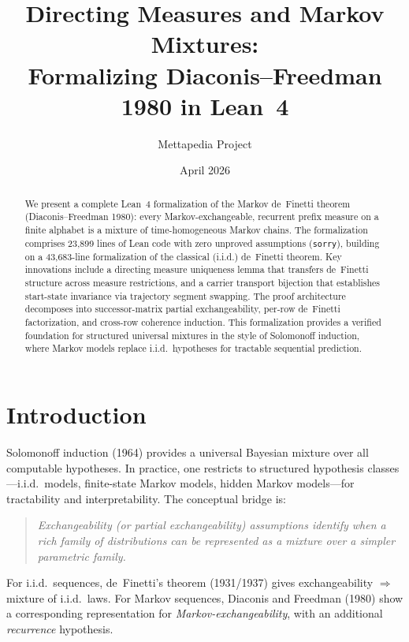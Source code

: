 \documentclass[11pt,a4paper]{article}
\title{Directing Measures and Markov Mixtures:\\[0.3em]
\large Formalizing Diaconis--Freedman 1980 in Lean~4}
\author{Mettapedia Project}
\date{April 2026}
\theoremstyle{definition}
\begin{document}
\maketitle

\begin{abstract}
We present a complete Lean~4 formalization of the Markov de~Finetti theorem
(Diaconis--Freedman 1980): every Markov-exchangeable, recurrent prefix measure
on a finite alphabet is a mixture of time-homogeneous Markov chains. The
formalization comprises 23,899 lines of Lean code with zero unproved
assumptions (\texttt{sorry}), building on a 43,683-line formalization of the
classical (i.i.d.) de~Finetti theorem. Key innovations include a directing
measure uniqueness lemma that transfers de~Finetti structure across measure
restrictions, and a carrier transport bijection that establishes start-state
invariance via trajectory segment swapping. The proof architecture decomposes
into successor-matrix partial exchangeability, per-row de~Finetti factorization,
and cross-row coherence induction. This formalization provides a verified
foundation for structured universal mixtures in the style of Solomonoff
induction, where Markov models replace i.i.d.\ hypotheses for tractable
sequential prediction.
\end{abstract}

\tableofcontents

\section{Introduction}

Solomonoff induction (1964) provides a universal Bayesian mixture over all
computable hypotheses. In practice, one restricts to structured hypothesis
classes---i.i.d.\ models, finite-state Markov models, hidden Markov
models---for tractability and interpretability. The conceptual bridge is:

\begin{quote}
\emph{Exchangeability (or partial exchangeability) assumptions identify when
a rich family of distributions can be represented as a mixture over a simpler
parametric family.}
\end{quote}

For i.i.d.\ sequences, de~Finetti's theorem (1931/1937) gives exchangeability
$\Rightarrow$ mixture of i.i.d.\ laws. For Markov sequences, Diaconis and
Freedman (1980) show a corresponding representation for \emph{Markov-exchangeability},
with an additional \emph{recurrence} hypothesis.
\end{document}

